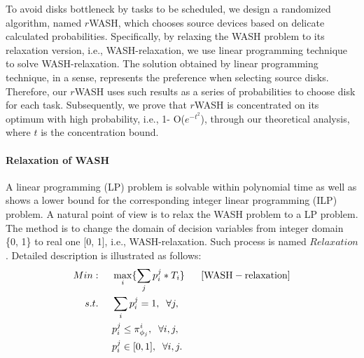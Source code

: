 \documentclass[conference]{IEEEtran}
\begin{document}
To avoid disks bottleneck by tasks to be scheduled, we design a randomized algorithm, named $r$WASH, which chooses source devices based on delicate calculated probabilities. 
Specifically, by relaxing the WASH problem to its relaxation version, i.e., WASH-relaxation, we use linear programming technique to solve WASH-relaxation. The solution obtained by linear programming technique, in a sense, represents the preference when selecting source disks. Therefore, our $r$WASH  uses such results as a series of probabilities to choose disk for each task. Subsequently, we prove that $r$WASH is concentrated on its optimum with high probability, i.e., 1- O($e^{-t^2}$), through our theoretical analysis, where $t$ is the concentration bound.



\paragraph{\textbf{Relaxation of WASH}} A linear programming (LP) problem is solvable within polynomial time as well as shows a lower bound for the corresponding integer linear programming (ILP) problem. A natural point of view is to relax the WASH problem to a LP problem. The method is to change the domain of decision variables from integer domain \{0, 1\} to real one [0, 1], i.e., WASH-relaxation. Such process is named $Relaxation$. Detailed description is illustrated as follows: 
\vspace{-0.2cm}
 \begin{align}
 Min:&\;\;\;\;\;\max\limits_{i}\{\sum_{j}p_i^j*T_i\}\;\;\;\;\;\;[\rm{WASH-relaxation}]\nonumber\\
 s.t. 
 &\;\;\;\;\;\sum_{i}p_i^j = 1,\;\;\forall j,\nonumber\\
 &\;\;\;\;\;p_i^j \leq \pi_{\phi_j}^{i},\;\;\forall i,j,\nonumber\\
 &\;\;\;\;\;p_i^j \in[0, 1],\;\;\forall i,j.\nonumber
 \end{align}
\end{document}
